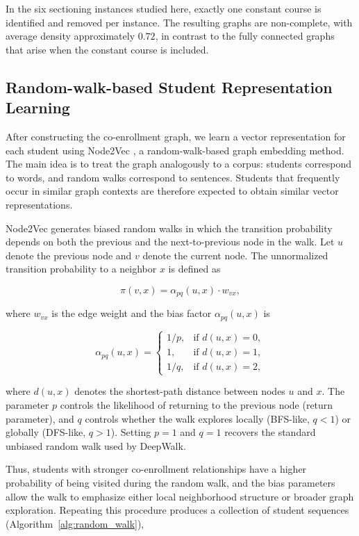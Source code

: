 \documentclass[pdflatex,sn-mathphys-num,iicol]{sn-jnl}%
\theoremstyle{thmstyleone}%
\theoremstyle{thmstyletwo}%
\theoremstyle{thmstylethree}%
\begin{document}
In the six sectioning instances studied here, exactly one constant course is identified and removed per instance. The resulting graphs are non-complete, with average density approximately $0.72$, in contrast to the fully connected graphs that arise when the constant course is included.

\subsection{Random-walk-based Student Representation Learning}
\label{subsec:embedding}

After constructing the co-enrollment graph, we learn a vector representation for each student using Node2Vec \cite{node2vec_grover2016}, a random-walk-based graph embedding method. The main idea is to treat the graph analogously to a corpus: students correspond to words, and random walks correspond to sentences. Students that frequently occur in similar graph contexts are therefore expected to obtain similar vector representations.

Node2Vec generates biased random walks in which the transition probability depends on both the previous and the next-to-previous node in the walk. Let $u$ denote the previous node and $v$ denote the current node. The unnormalized transition probability to a neighbor $x$ is defined as

$$
\pi(v,x) = \alpha_{pq}(u,x) \cdot w_{vx},
$$

where $w_{vx}$ is the edge weight and the bias factor $\alpha_{pq}(u,x)$ is

$$
\alpha_{pq}(u,x) =
\begin{cases}
1/p, & \text{if } d(u,x)=0,\\
1, & \text{if } d(u,x)=1,\\
1/q, & \text{if } d(u,x)=2,
\end{cases}
$$

where $d(u,x)$ denotes the shortest-path distance between nodes $u$ and $x$. The parameter $p$ controls the likelihood of returning to the previous node (return parameter), and $q$ controls whether the walk explores locally (BFS-like, $q<1$) or globally (DFS-like, $q>1$). Setting $p=1$ and $q=1$ recovers the standard unbiased random walk used by DeepWalk.

Thus, students with stronger co-enrollment relationships have a higher probability of being visited during the random walk, and the bias parameters allow the walk to emphasize either local neighborhood structure or broader graph exploration. Repeating this procedure produces a collection of student sequences (Algorithm~\ref{alg:random_walk}),
\end{document}

